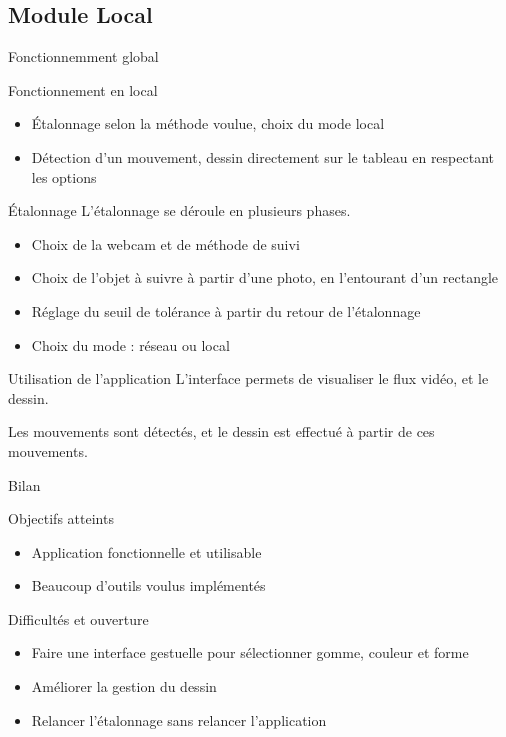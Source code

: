\documentclass{beamer}
\begin{document}
	\subsection{Module Local}
		\begin{frame}{Fonctionnemment global}
			\begin{block}{Fonctionnement en local}
				\begin{itemize}
				\item Étalonnage selon la méthode voulue, choix du mode local
				\item Détection d'un mouvement, dessin directement sur le tableau en respectant les options
				\end{itemize}
			\end{block}
		\end{frame}
		
		\begin{frame}{Étalonnage}
			L'étalonnage se déroule en plusieurs phases.
			\begin{itemize}
			\item Choix de la webcam et de méthode de suivi
			\item Choix de l'objet à suivre à partir d'une photo, en l'entourant d'un rectangle
			\item Réglage du seuil de tolérance à partir du retour de l'étalonnage
			\item Choix du mode : réseau ou local
			\end{itemize}
		\end{frame}
		
		\begin{frame}{Utilisation de l'application}
		L'interface permets de visualiser le flux vidéo, et le dessin.
		
		Les mouvements sont détectés, et le dessin est effectué à partir de ces mouvements.
		\end{frame}
		
		\begin{frame}{Bilan}
			\begin{exampleblock}{Objectifs atteints}
				\begin{itemize}
				\item Application fonctionnelle et utilisable
				\item Beaucoup d'outils voulus implémentés
				\end{itemize}
			\end{exampleblock}
			\pause
			\begin{alertblock}{Difficultés et ouverture}
				\begin{itemize}
				\item Faire une interface gestuelle pour sélectionner gomme, couleur et forme
				\item Améliorer la gestion du dessin
				\item Relancer l'étalonnage sans relancer l'application
				\end{itemize}
			\end{alertblock}
		\end{frame}
\end{document}
